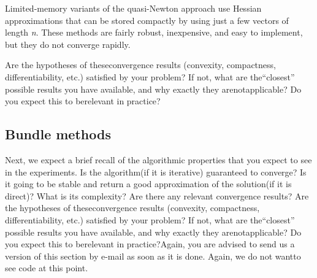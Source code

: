 Limited-memory variants  of  the  quasi-Newton  approach use  Hessian  approximations  that  can  be stored compactly by using just a few vectors of length \textit{n}. These methods are fairly robust, inexpensive, and easy to implement, but they do not converge rapidly.

 
  Are the hypotheses of theseconvergence results (convexity, compactness, differentiability, etc.) satisfied by your problem? If not, what are the“closest” possible results you have available, and why exactly they arenotapplicable?  Do you expect this to berelevant in practice?

\subsection{Bundle methods}


Next, we expect a brief recall of the algorithmic properties that you expect to see in the experiments. Is the algorithm(if it is iterative) guaranteed to converge? Is it going to be stable and return a good approximation of the solution(if it is direct)? What is its complexity? Are there any relevant convergence results? Are the hypotheses of theseconvergence results (convexity, compactness, differentiability, etc.) satisfied by your problem? If not, what are the“closest” possible results you have available, and why exactly they arenotapplicable?  Do you expect this to berelevant in practice?Again, you are advised to send us a version of this section by e-mail as soon as it is done. Again, we do not wantto see code at this point.
